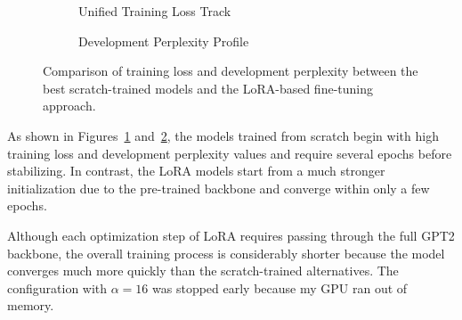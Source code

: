 \begin{figure}[H]
\centering
\begin{subfigure}{\columnwidth}
\centering

\caption{Unified Training Loss Track}
\label{fig:loss_train}
\end{subfigure}

\vspace{2mm}

\begin{subfigure}{\columnwidth}
\centering

\caption{Development Perplexity Profile}
\label{fig:ppl_dev}
\end{subfigure}

\caption{Comparison of training loss and development perplexity between the best scratch-trained models and the LoRA-based fine-tuning approach.}
\label{fig:unified_curves}
\end{figure}

As shown in Figures~\ref{fig:loss_train} and~\ref{fig:ppl_dev}, the models trained from scratch begin with high training loss and development perplexity values and require several epochs before stabilizing. In contrast, the LoRA models start from a much stronger initialization due to the pre-trained backbone and converge within only a few epochs.

Although each optimization step of LoRA requires passing through the full GPT2 backbone, the overall training process is considerably shorter because the model converges much more quickly than the scratch-trained alternatives. The configuration with $\alpha=16$ was stopped early because my GPU ran out of memory.
